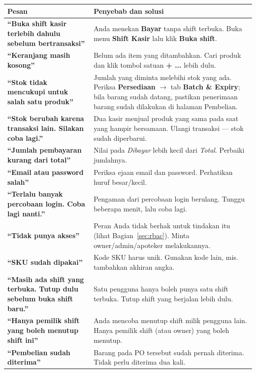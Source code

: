 \documentclass[11pt,a4paper]{article}
\newcommand{\btn}[1]{\textcolor{primary}{\textbf{#1}}}
\newcommand{\field}[1]{\textit{#1}}
\begin{document}
\begin{longtable}{@{}L{6.0cm}L{8.8cm}@{}}
  \toprule
  \textbf{Pesan} & \textbf{Penyebab dan solusi} \\
  \midrule
  \endhead
  \textbf{``Buka shift kasir terlebih dahulu sebelum bertransaksi''}
  & Anda menekan \btn{Bayar} tanpa shift terbuka. Buka menu \textbf{Shift Kasir} lalu klik \btn{Buka shift}. \\
  \addlinespace
  \textbf{``Keranjang masih kosong''}
  & Belum ada item yang ditambahkan. Cari produk dan klik tombol satuan \btn{+ ...} lebih dulu. \\
  \addlinespace
  \textbf{``Stok tidak mencukupi untuk salah satu produk''}
  & Jumlah yang diminta melebihi stok yang ada. Periksa \textbf{Persediaan} $\rightarrow$ tab \textbf{Batch \& Expiry}; bila barang sudah datang, pastikan penerimaan barang sudah dilakukan di halaman Pembelian. \\
  \addlinespace
  \textbf{``Stok berubah karena transaksi lain. Silakan coba lagi.''}
  & Dua kasir menjual produk yang sama pada saat yang hampir bersamaan. Ulangi transaksi --- stok sudah diperbarui. \\
  \addlinespace
  \textbf{``Jumlah pembayaran kurang dari total''}
  & Nilai pada \field{Dibayar} lebih kecil dari \field{Total}. Perbaiki jumlahnya. \\
  \addlinespace
  \textbf{``Email atau password salah''}
  & Periksa ejaan email dan password. Perhatikan huruf besar/kecil. \\
  \addlinespace
  \textbf{``Terlalu banyak percobaan login. Coba lagi nanti.''}
  & Pengaman dari percobaan login berulang. Tunggu beberapa menit, lalu coba lagi. \\
  \addlinespace
  \textbf{``Tidak punya akses''}
  & Peran Anda tidak berhak untuk tindakan itu (lihat Bagian~\ref{sec:rbac}). Minta owner/admin/apoteker melakukannya. \\
  \addlinespace
  \textbf{``SKU sudah dipakai''}
  & Kode SKU harus unik. Gunakan kode lain, mis. tambahkan akhiran angka. \\
  \addlinespace
  \textbf{``Masih ada shift yang terbuka. Tutup dulu sebelum buka shift baru.''}
  & Satu pengguna hanya boleh punya satu shift terbuka. Tutup shift yang berjalan lebih dulu. \\
  \addlinespace
  \textbf{``Hanya pemilik shift yang boleh menutup shift ini''}
  & Anda mencoba menutup shift milik pengguna lain. Hanya pemilik shift (atau owner) yang boleh menutup. \\
  \addlinespace
  \textbf{``Pembelian sudah diterima''}
  & Barang pada PO tersebut sudah pernah diterima. Tidak perlu diterima dua kali. \\
  \bottomrule
\end{longtable}
\end{document}
